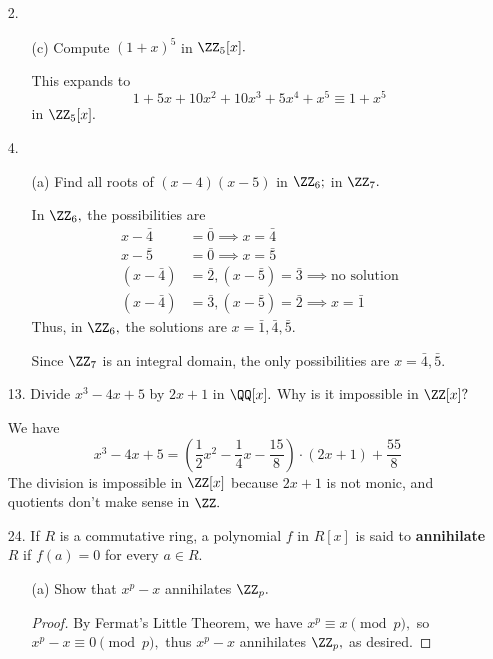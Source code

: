 \documentclass{article}
\begin{document}
\begin{itemize}
	\item[2.]
		\begin{itemize}
			\item[(c)] Compute $(1+x)^5$ in $\ZZ_5[x].$
				\begin{soln}
					This expands to \[1+5x+10x^2+10x^3+5x^4+x^5\equiv 1+x^5\] in $\ZZ_5[x].$
				\end{soln}
				
		\end{itemize}

	\item[4.]
		\begin{itemize}
			\item[(a)] Find all roots of $(x-4)(x-5)$ in $\ZZ_6;$ in $\ZZ_7.$
				\begin{soln}
					In $\ZZ_6,$ the possibilities are 
					\begin{align*}
						x-\bar{4} &= \bar{0}\implies x = \bar{4} \\
						x-\bar{5} &= \bar0\implies x=\bar 5 \\
						(x-\bar4) &= \bar2, (x-\bar5)=\bar3 \implies \text{no solution} \\
						(x-\bar4) &= \bar3, (x-\bar5)=\bar2 \implies x=\bar1
					\end{align*}
					Thus, in $\ZZ_6,$ the solutions are $x=\bar1, \bar4, \bar5.$

					Since $\ZZ_7$ is an integral domain, the only possibilities are $x=\bar4, \bar 5.$
				\end{soln}
				
		\end{itemize}

	\item[13.] Divide $x^3-4x+5$ by $2x+1$ in $\QQ[x].$ Why is it impossible in $\ZZ[x]?$
		\begin{soln}
			We have \[x^3-4x+5=\left( \frac{1}{2}x^2-\frac{1}{4}x-\frac{15}{8} \right)\cdot(2x+1) + \frac{55}{8}\] The division is impossible in $\ZZ[x]$ because $2x+1$ is not monic, and quotients don't make sense in $\ZZ.$
		\end{soln}

	\item[24.] If $R$ is a commutative ring, a polynomial $f$ in $R[x]$ is said to \textbf{annihilate} $R$ if $f(a)=0$ for every $a\in R.$ 
		\begin{itemize}
			\item[(a)] Show that $x^p-x$ annihilates $\ZZ_p.$
				\begin{proof}
					By Fermat's Little Theorem, we have $x^p\equiv x\pmod p,$ so $x^p-x\equiv0\pmod p,$ thus $x^p-x$ annihilates $\ZZ_p,$ as desired.
				\end{proof}
				
		\end{itemize}
		
\end{itemize}
\end{document}
